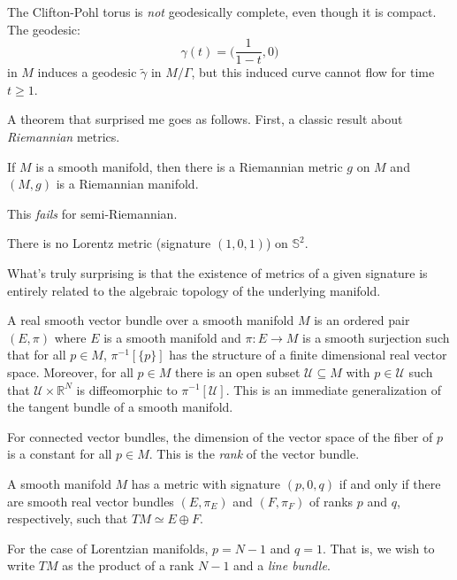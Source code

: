 \documentclass{beamer}
\begin{document}
    \begin{frame}
        The Clifton-Pohl torus is \textit{not} geodesically complete, even
        though it is compact. The geodesic:
        \begin{equation}
            \gamma(t)=\Big(\frac{1}{1-t},0\Big)
        \end{equation}
        in $M$ induces a geodesic $\tilde{\gamma}$ in $M/\Gamma$, but this
        induced curve cannot flow for time $t\geq{1}$.
    \end{frame}
    \begin{frame}
        A theorem that surprised me goes as follows. First, a classic result
        about \textit{Riemannian} metrics.
        \begin{theorem}
            If $M$ is a smooth manifold, then there is a Riemannian metric $g$
            on $M$ and $(M,g)$ is a Riemannian manifold.
        \end{theorem}
        This \textit{fails} for semi-Riemannian.
        \begin{theorem}
            There is no Lorentz metric (signature $(1,0,1)$) on $\mathbb{S}^{2}$.
        \end{theorem}
    \end{frame}
    \begin{frame}
        What's truly surprising is that the existence of metrics of a given
        signature is entirely related to the algebraic topology of the
        underlying manifold.
        \par\hfill\par
        A real smooth vector bundle over a smooth manifold $M$ is an ordered
        pair $(E,\pi)$ where $E$ is a smooth manifold and
        $\pi:E\rightarrow{M}$ is a smooth surjection such that for all
        $p\in{M}$, $\pi^{-1}[\{p\}]$ has the structure of a finite dimensional
        real vector space. Moreover, for all $p\in{M}$ there is an open
        subset $\mathcal{U}\subseteq{M}$ with $p\in\mathcal{U}$ such that
        $\mathcal{U}\times\mathbb{R}^{N}$ is diffeomorphic to
        $\pi^{-1}[\mathcal{U}]$. This is an immediate generalization of the
        tangent bundle of a smooth manifold.
        \par\hfill\par
        For connected vector bundles, the dimension of the vector space of the
        fiber of $p$ is a constant for all $p\in{M}$. This is the
        \textit{rank} of the vector bundle.
    \end{frame}
    \begin{frame}
        \begin{theorem}
            A smooth manifold $M$ has a metric with signature $(p,0,q)$ if and
            only if there are smooth real vector bundles $(E,\pi_{E})$ and
            $(F,\pi_{F})$ of ranks $p$ and $q$, respectively,
            such that $TM\simeq{E}\oplus{F}$.
        \end{theorem}
        For the case of Lorentzian manifolds, $p=N-1$ and $q=1$. That is, we
        wish to write $TM$ as the product of a rank $N-1$ and a
        \textit{line bundle}.
    \end{frame}
\end{document}

